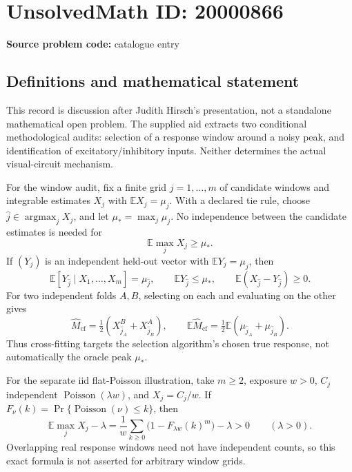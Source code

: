 \documentclass[11pt]{article}
\newcommand{\E}{\mathbb{E}}
\begin{document}
\section*{UnsolvedMath ID: 20000866}
\textbf{Source problem code:} catalogue entry
\subsection{Definitions and mathematical statement}
This record is discussion after Judith Hirsch's presentation, not a standalone mathematical open problem. The supplied aid extracts two conditional methodological audits: selection of a response window around a noisy peak, and identification of excitatory/inhibitory inputs. Neither determines the actual visual-circuit mechanism.

For the window audit, fix a finite grid \(j=1,\ldots,m\) of candidate windows and integrable estimates \(X_j\) with \(\E X_j=\mu_j\). With a declared tie rule, choose \(\widehat j\in\operatorname{argmax}_jX_j\), and let \(\mu_*=\max_j\mu_j\). No independence between the candidate estimates is needed for
\[
 \E\max_jX_j\geq\mu_*.
\]
If \((Y_j)\) is an independent held-out vector with \(\E Y_j=\mu_j\), then
\[
 \E[Y_{\widehat j}\mid X_1,\ldots,X_m]=\mu_{\widehat j},\qquad
 \E Y_{\widehat j}\leq\mu_*,\qquad
 \E(X_{\widehat j}-Y_{\widehat j})\geq0.
\]
For two independent folds \(A,B\), selecting on each and evaluating on the other gives
\[
 \widehat M_{\mathrm{cf}}=\tfrac12(X^{B}_{\widehat j_A}+X^{A}_{\widehat j_B}),\qquad
 \E\widehat M_{\mathrm{cf}}=\tfrac12\E(\mu_{\widehat j_A}+\mu_{\widehat j_B}).
\]
Thus cross-fitting targets the selection algorithm's chosen true response, not automatically the oracle peak \(\mu_*\).

For the separate iid flat-Poisson illustration, take \(m\geq2\), exposure \(w>0\), \(C_j\) independent \(\operatorname{Poisson}(\lambda w)\), and \(X_j=C_j/w\). If \(F_\nu(k)=\Pr\{\operatorname{Poisson}(\nu)\leq k\}\), then
\[
 \E\max_jX_j-\lambda
 =\frac1w\sum_{k\geq0}\bigl(1-F_{\lambda w}(k)^m\bigr)-\lambda>0
 \qquad(\lambda>0).
\]
Overlapping real response windows need not have independent counts, so this exact formula is not asserted for arbitrary window grids.
\end{document}
